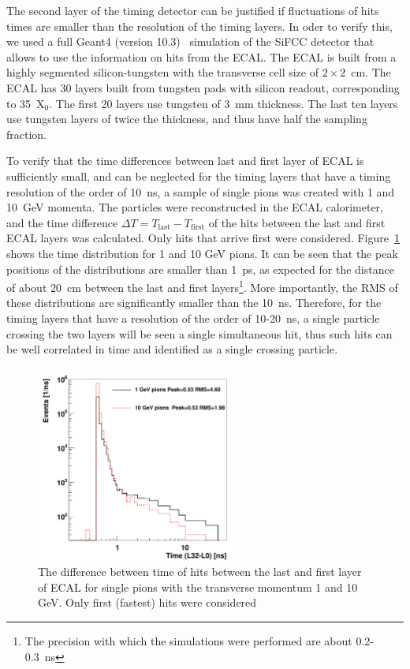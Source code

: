 \documentclass[final,1p,11pt]{elsarticle}
\begin{document}
The second layer of the timing detector can be justified if fluctuations of hits times are smaller than  the resolution 
of the timing layers. In oder to verify this, we used a full Geant4 (version 10.3)~\cite{Allison2016186} simulation 
of the SiFCC detector \cite{Chekanov:2016ppq} that allows to use the information on hits from the ECAL.
The ECAL is built from a highly segmented silicon-tungsten  with the transverse cell size of $2 \times 2$~cm.
The ECAL has 30 layers built from tungsten pads with silicon readout,
corresponding to 35~X$_{0}$. The first 20 layers use tungsten of 3~mm thickness.
The last ten layers use tungsten layers of
twice the thickness, and thus have half the  sampling fraction.  

To verify that the time differences between last and first layer of ECAL is sufficiently small, and can be neglected for the timing layers that
have a timing resolution of the order of 10~ns, a sample of single pions was created with 1 and 10~GeV momenta. 
The particles were reconstructed in the ECAL calorimeter,
and the time difference $\Delta T= T_{\mathrm{last}}-T_{\mathrm{first}}$ of the hits between the last and first ECAL layers was calculated.
Only hits that arrive first were considered.
Figure~\ref{fig:timediff} shows the time distribution for 1 and 10 GeV pions. It can be seen that the peak positions of the distributions are smaller
than 1~ps, as expected for the distance of about 20~cm between  the last and first layers\footnote{The precision with which the simulations were performed are about 0.2-0.3~ns}. More importantly, the RMS of these distributions are significantly smaller than the 10~ns. 
Therefore, for the timing layers that have a resolution of the order of 10-20~ns, a single particle crossing the two layers  will be seen a single simultaneous hit,
thus such hits can be well correlated in time and identified as a single crossing particle.
 

\begin{figure}
\begin{center}
   \includegraphics[width=0.6\textwidth]{timeECAL_2layers1.pdf}\hfill
\end{center}
\caption{The difference between time of hits between the last and first layer of ECAL for single pions with the transverse momentum 1 and 10 GeV. 
Only first (fastest) hits were considered}
\label{fig:timediff}
\end{figure}
\end{document}
